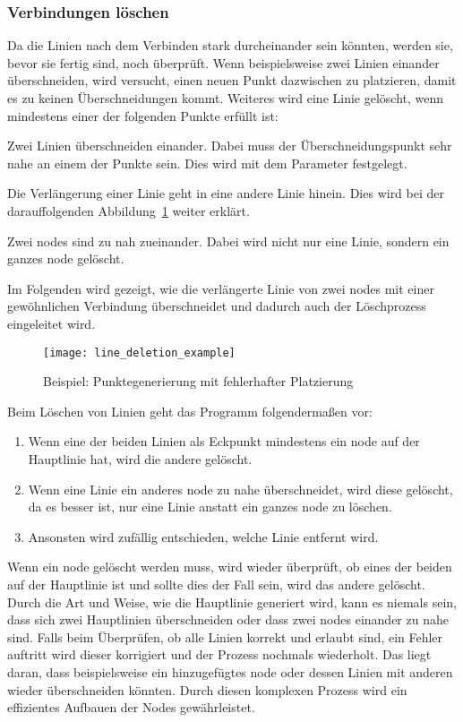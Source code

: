 \subsubsection{Verbindungen löschen}\label{subsubsec:verbindungen-loeschen}
Da die Linien nach dem Verbinden stark durcheinander sein könnten, werden sie, bevor sie fertig sind, noch überprüft.
Wenn beispielsweise zwei Linien einander überschneiden, wird versucht, einen neuen Punkt dazwischen zu platzieren, damit es zu keinen Überschneidungen kommt.
Weiteres wird eine Linie gelöscht, wenn mindestens einer der folgenden Punkte erfüllt ist:
\begin{liste}
    \item Zwei Linien überschneiden einander.
    Dabei muss der Überschneidungspunkt sehr nahe an einem der Punkte sein.
    Dies wird mit dem Parameter  festgelegt.
    \item Die Verlängerung einer Linie geht in eine andere Linie hinein.
    Dies wird bei der darauffolgenden Abbildung~\ref{fig:line-deletion} weiter erklärt.
    \item Zwei nodes sind zu nah zueinander.
    Dabei wird nicht nur eine Linie, sondern ein ganzes node gelöscht.
\end{liste}

Im Folgenden wird gezeigt, wie die verlängerte Linie von zwei nodes mit einer gewöhnlichen Verbindung überschneidet und dadurch auch der Löschprozess eingeleitet wird.
\begin{figure}[H]
    \centering
    \texttt{[image: line\_deletion\_example]}
    \caption{Beispiel: Punktegenerierung mit fehlerhafter Platzierung}\label{fig:line-deletion}
\end{figure}

Beim Löschen von Linien geht das Programm folgendermaßen vor:
\begin{enumerate}
    \item Wenn eine der beiden Linien als Eckpunkt mindestens ein node auf der Hauptlinie hat, wird die andere gelöscht.
    \item Wenn eine Linie ein anderes node zu nahe überschneidet, wird diese gelöscht, da es besser ist, nur eine Linie anstatt ein ganzes node zu löschen.
    \item Ansonsten wird zufällig entschieden, welche Linie entfernt wird.
\end{enumerate}

Wenn ein node gelöscht werden muss, wird wieder überprüft, ob eines der beiden auf der Hauptlinie ist und sollte dies der Fall sein, wird das andere gelöscht.
Durch die Art und Weise, wie die Hauptlinie generiert wird, kann es niemals sein, dass sich zwei Hauptlinien überschneiden oder dass zwei nodes einander zu nahe sind.
Falls beim Überprüfen, ob alle Linien korrekt und erlaubt sind, ein Fehler auftritt wird dieser korrigiert und der Prozess nochmals wiederholt.
Das liegt daran, dass beispielsweise ein hinzugefügtes node oder dessen Linien mit anderen wieder überschneiden könnten.
Durch diesen komplexen Prozess wird ein effizientes Aufbauen der Nodes gewährleistet.

